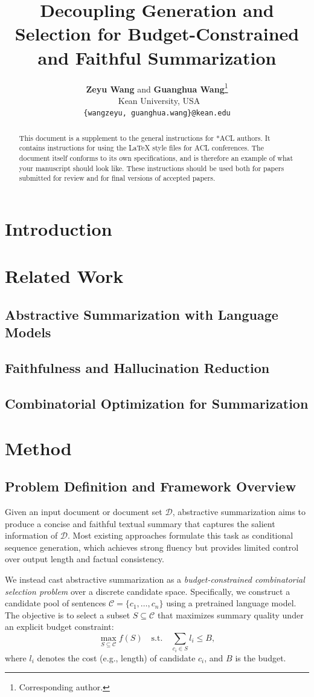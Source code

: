 \documentclass[11pt]{article}
\title{Decoupling Generation and Selection for Budget-Constrained and Faithful Summarization}
\author{
\textbf{Zeyu Wang} and
\textbf{Guanghua Wang}\thanks{Corresponding author.}
\\
\ Kean University, USA
\\
\small{
\texttt{\{wangzeyu, guanghua.wang\}@kean.edu}
}
}
\begin{document}
\maketitle
\begin{abstract}
This document is a supplement to the general instructions for *ACL authors. It contains instructions for using the \LaTeX{} style files for ACL conferences.
The document itself conforms to its own specifications, and is therefore an example of what your manuscript should look like.
These instructions should be used both for papers submitted for review and for final versions of accepted papers.
\end{abstract}
\section{Introduction}
\section{Related Work}
\subsection{Abstractive Summarization with Language Models}
\subsection{Faithfulness and Hallucination Reduction}
\subsection{Combinatorial Optimization for Summarization}
\section{Method}

\subsection{Problem Definition and Framework Overview}

Given an input document or document set $\mathcal{D}$, abstractive summarization aims to produce a concise and faithful textual summary that captures the salient information of $\mathcal{D}$. Most existing approaches formulate this task as conditional sequence generation, which achieves strong fluency but provides limited control over output length and factual consistency.

We instead cast abstractive summarization as a \emph{budget-constrained combinatorial selection problem} over a discrete candidate space. Specifically, we construct a candidate pool of sentences
$\mathcal{C} = \{c_1, \dots, c_n\}$
using a pretrained language model. The objective is to select a subset $S \subseteq \mathcal{C}$ that maximizes summary quality under an explicit budget constraint:
\begin{equation}
\max_{S \subseteq \mathcal{C}} f(S)
\quad \text{s.t.} \quad
\sum_{c_i \in S} l_i \le B,
\end{equation}
where $l_i$ denotes the cost (e.g., length) of candidate $c_i$, and $B$ is the budget.
\end{document}
